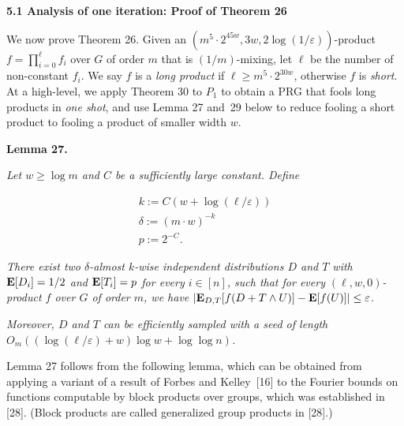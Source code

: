 \documentclass[10pt,a4paper]{article}
\begin{document}
\par\medskip\noindent\textbf{
5.1 Analysis of one iteration: Proof of Theorem 26
}\par




We now prove Theorem 26.
Given an $(m^{5}\cdot 2^{45w},3w,2\log(1/\varepsilon))$-product $f=\prod_{i=0}^{\ell}f_{i}$ over $G$ of order $m$ that is $(1/m)$-mixing, let $\ell$ be the number of non-constant $f_{i}$.
We say $f$ is a \emph{long product} if $\ell\geq m^{5}\cdot 2^{30w}$, otherwise $f$ is \emph{short}.
At a high-level, we apply Theorem 30 to $P_{1}$ to obtain a PRG that fools long products in \emph{one shot}, and use Lemma 27 and 29 below to reduce fooling a short product to fooling a product of smaller width $w$.\par





\par\medskip\noindent\textbf{
\textbf{Lemma 27}\textbf{.}
}\par



\emph{Let $w\geq\log m$ and $C$ be a sufficiently large constant.
Define}\par


\[\begin{gathered}
\displaystyle k \displaystyle:=C(w+\log(\ell/\varepsilon)) \\
\displaystyle\delta \displaystyle:=(m\cdot w)^{-k} \\
\displaystyle p \displaystyle:=2^{-C}.
\end{gathered}\]


\emph{There exist two $\delta$-almost $k$-wise independent distributions $D$ and $T$ with $\mathop{\bf E\/}[D_{i}]=1/2$ and $\mathop{\bf E\/}[T_{i}]=p$ for every $i\in[n]$, such that for every $(\ell,w,0)$-product $f$ over $G$ of order $m$, we have $\lvert\mathop{\bf E\/}_{D,T}[f(D+T\wedge U)]-\mathop{\bf E\/}[f(U)]\rvert\leq\varepsilon$.}\par




\emph{Moreover, $D$ and $T$ can be efficiently sampled with a seed of length $O_{m}((\log(\ell/\varepsilon)+w)\log w+\log\log n)$.}\par






Lemma 27 follows from the following lemma, which can be obtained from applying a variant of a result of Forbes and Kelley [16] to the Fourier bounds on functions computable by block products over groups, which was established in [28].
(Block products are called generalized group products in [28].)\par
\end{document}
